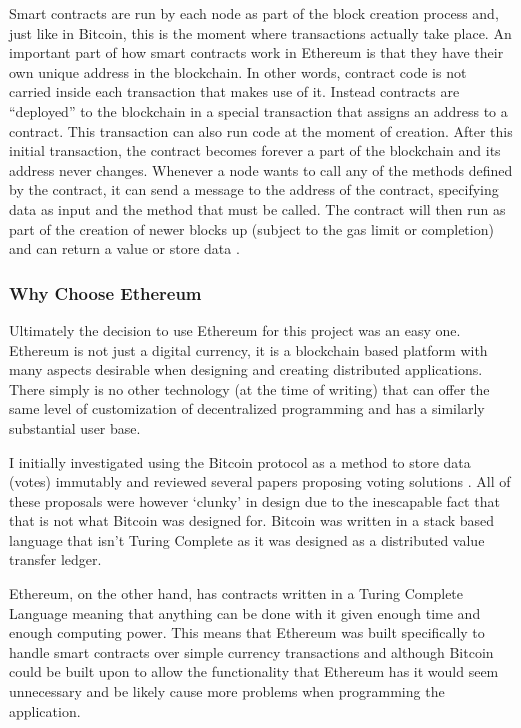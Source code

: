 \documentclass{article}
\begin{document}
Smart contracts are run by each node as part of the block creation process and, just like in Bitcoin, this is the moment where transactions actually take place. An important part of how smart contracts work in Ethereum is that they have their own unique address in the blockchain. In other words, contract code is not carried inside each transaction that makes use of it. Instead contracts are ``deployed'' to the blockchain in a special transaction that assigns an address to a contract. This transaction can also run code at the moment of creation. After this initial transaction, the contract becomes forever a part of the blockchain and its address never changes. Whenever a node wants to call any of the methods defined by the contract, it can send a message to the address of the contract, specifying data as input and the method that must be called. The contract will then run as part of the creation of newer blocks up (subject to the gas limit or completion) and can return a value or store data \citep{59_peyrott_senanayaka_2017}.

\subsubsection{Why Choose Ethereum}
Ultimately the decision to use Ethereum for this project was an easy one. Ethereum is not just a digital currency, it is a blockchain based platform with many aspects desirable when designing and creating distributed applications. There simply is no other technology (at the time of writing) that can offer the same level of customization of decentralized programming and has a similarly substantial user base.

I initially investigated using the Bitcoin protocol as a method to store data (votes) immutably and reviewed several papers proposing voting solutions \citep{60_flint_2017}. All of these proposals were however `clunky' in design due to the inescapable fact that that is not what Bitcoin was designed for. Bitcoin was written in a stack based language that isn't Turing Complete as it was designed as a distributed value transfer ledger. 

Ethereum, on the other hand, has contracts written in a Turing Complete Language meaning that anything can be done with it given enough time and enough computing power. This means that Ethereum was built specifically to handle smart contracts over simple currency transactions and although Bitcoin could be built upon to allow the functionality that Ethereum has it would seem unnecessary and be likely cause more problems when programming the application.
\end{document}
